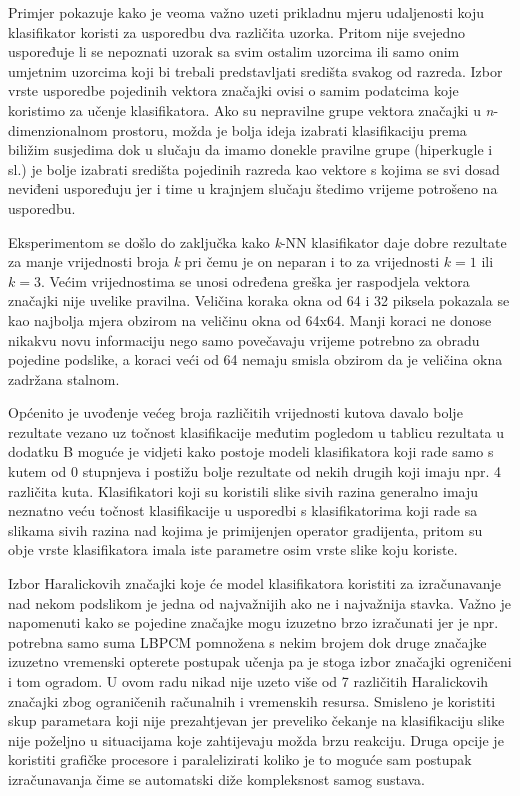 \documentclass[times, utf8, zavrsni, numeric]{fer}
\begin{document}
\bigbreak

Primjer pokazuje kako je veoma važno uzeti prikladnu mjeru udaljenosti koju klasifikator koristi
za usporedbu dva različita uzorka. Pritom nije svejedno uspoređuje li se nepoznati 
uzorak sa svim ostalim uzorcima ili samo onim umjetnim uzorcima koji bi trebali
predstavljati središta svakog od razreda. Izbor vrste usporedbe pojedinih vektora
značajki ovisi o samim podatcima koje koristimo za učenje klasifikatora. Ako su nepravilne
grupe vektora značajki u \textit{n}-dimenzionalnom prostoru, možda je bolja ideja izabrati
klasifikaciju prema biližim susjedima dok u slučaju da imamo donekle pravilne grupe (hiperkugle i sl.) 
je bolje izabrati središta pojedinih razreda kao vektore s kojima se svi dosad neviđeni uspoređuju
jer i time u krajnjem slučaju štedimo vrijeme potrošeno na usporedbu. 

\bigbreak

Eksperimentom se došlo do zaključka kako \textit{k}-NN klasifikator daje dobre rezultate
za manje vrijednosti broja \textit{k} pri čemu je on neparan i to za vrijednosti \(k=1\) ili \(k=3\).
Većim vrijednostima se unosi određena greška jer raspodjela vektora značajki nije uvelike pravilna.
Veličina koraka okna od 64 i 32 piksela pokazala se kao najbolja  mjera obzirom na veličinu okna od 64x64. 
Manji koraci ne donose nikakvu novu informaciju nego samo povečavaju vrijeme potrebno za 
obradu pojedine podslike, a koraci veći od 64 nemaju smisla obzirom da je veličina okna zadržana
stalnom. 

\bigbreak

Općenito je uvođenje većeg broja različitih vrijednosti kutova davalo bolje rezultate
vezano uz točnost klasifikacije međutim pogledom u tablicu rezultata u dodatku B moguće je 
vidjeti kako postoje modeli klasifikatora koji rade samo s kutem od 0 stupnjeva i postižu
bolje rezultate od nekih drugih koji imaju npr. 4 različita kuta. Klasifikatori koji su koristili
slike sivih razina generalno imaju neznatno veću točnost klasifikacije u usporedbi s klasifikatorima 
koji rade sa slikama sivih razina nad kojima je primijenjen operator gradijenta, pritom su obje vrste
klasifikatora imala iste parametre osim vrste slike koju koriste.

\bigbreak

Izbor Haralickovih značajki koje će model klasifikatora koristiti za izračunavanje nad nekom
podslikom je jedna od najvažnijih ako ne i najvažnija stavka. Važno je napomenuti kako se
pojedine značajke mogu izuzetno brzo izračunati jer je npr. potrebna samo suma LBPCM
pomnožena s nekim brojem dok druge značajke izuzetno vremenski opterete postupak 
učenja pa je stoga izbor značajki ogreničeni i tom ogradom. U ovom radu nikad nije uzeto
više od 7 različitih Haralickovih značajki zbog ograničenih računalnih i vremenskih resursa.
Smisleno je koristiti skup parametara koji nije prezahtjevan jer preveliko čekanje na klasifikaciju
slike nije poželjno u situacijama koje zahtijevaju možda brzu reakciju. Druga opcije je 
koristiti grafičke procesore i paralelizirati koliko je to moguće sam postupak izračunavanja
čime se automatski diže kompleksnost samog sustava.
\end{document}
